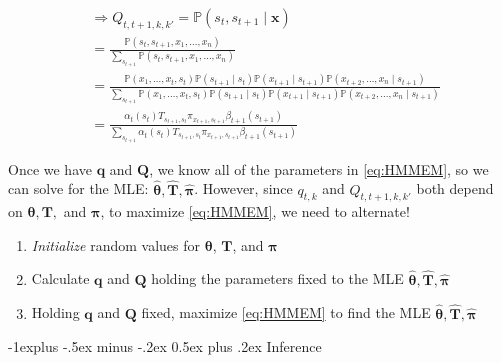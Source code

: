 \documentclass[10pt,landscape]{article}
\makeatletter
\newcommand{\p}{\mathbb{P}}
\renewcommand{\subsection}{\@startsection{subsection}{2}{0mm}%
                                {-1explus -.5ex minus -.2ex}%
                                {0.5ex plus .2ex}%
                                {\normalfont\normalsize\bfseries}}
\makeatother
\begin{document}
\begin{multicols*}{3}
	\begin{equation*}\begin{aligned}
			 & \Rightarrow Q_{t, t+1, k, k'} = \p(s_{t}, s_{t + 1} \mid \mathbf{x})                                                                                                                                                                                                                       \\
			 & = \frac{\p(s_{t}, s_{t + 1}, x_{1}, \dots, x_{n})}{\sum_{s_{t + 1}} \p(s_{t}, s_{t + 1}, x_{1}, \dots, x_{n})}                                                                                                                                                                             \\
			 & = \frac{\p(x_{1}, \dots, x_{t}, s_{t}) \p(s_{t + 1} \mid s_{t}) \p(x_{t + 1} \mid s_{t + 1}) \p(x_{t + 2}, \dots, x_{n} \mid s_{t + 1})}{\sum_{s_{t + 1}} \p(x_{1}, \dots, x_{t}, s_{t}) \p(s_{t + 1} \mid s_{t}) \p(x_{t + 1} \mid s_{t + 1}) \p(x_{t + 2}, \dots, x_{n} \mid s_{t + 1})} \\
			 & = \frac{\alpha_{t}(s_{t}) T_{s_{t + 1}, s_{t}} \pi_{x_{t + 1}, s_{t + 1}} \beta_{t + 1}(s_{t + 1})}{\sum_{s_{t + 1}} \alpha_{t}(s_{t}) T_{s_{t + 1}, s_{t}} \pi_{x_{t + 1}, s_{t + 1}} \beta_{t + 1}(s_{t + 1})}
		\end{aligned}\end{equation*}

	Once we have $\mathbf{q}$ and $\mathbf{Q}$, we know all of the parameters in \ref{eq:HMMEM}, so we can solve for the MLE: $\hat{\pmb{\theta}}, \hat{\mathbf{T}}, \hat{\pmb{\pi}}$. However, since $q_{t, k}$ and $Q_{t, t + 1, k, k'}$ both depend on $\pmb{\theta}, \mathbf{T},$ and $\pmb{\pi}$, to maximize \ref{eq:HMMEM}, we need to alternate!

	\begin{enumerate}
		\item \textit{Initialize} random values for $\pmb{\theta}$, $\mathbf{T}$, and $\pmb{\pi}$
		\item Calculate $\mathbf{q}$ and $\mathbf{Q}$ holding the parameters fixed to the MLE $\hat{\pmb{\theta}}, \hat{\mathbf{T}}, \hat{\pmb{\pi}}$
		\item Holding $\mathbf{q}$ and $\mathbf{Q}$ fixed, maximize \ref{eq:HMMEM} to find the MLE $\hat{\pmb{\theta}}, \hat{\mathbf{T}}, \hat{\pmb{\pi}}$
	\end{enumerate}

	\subsection{Inference}
	\begin{minipage}{\linewidth}
		\centering
	\end{minipage} \vspace{-0.25 cm}


\end{multicols*}
\end{document}
